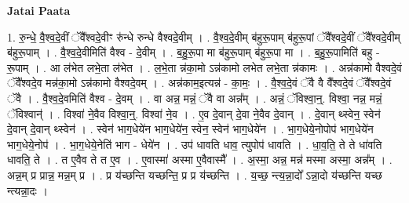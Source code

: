 \documentclass[17pt]{extarticle}
\begin{document}
\textbf{Jatai Paata} \newline

1. रु॒न्धे॒ वै॒श्व॒दे॒वीं ॅवै᳚श्वदे॒वीꣳ रु॑न्धे रुन्धे वैश्वदे॒वीम् । . वै॒श्व॒दे॒वीम् ब॑हुरू॒पाम् ब॑हुरू॒पां ॅवै᳚श्वदे॒वीं ॅवै᳚श्वदे॒वीम् ब॑हुरू॒पाम् । . वै॒श्व॒दे॒वीमिति॑ वैश्व - दे॒वीम् । . ब॒हु॒रू॒पा मा ब॑हुरू॒पाम् ब॑हुरू॒पा मा । . ब॒हु॒रू॒पामिति॑ बहु - रू॒पाम् । . आ ल॑भेत लभे॒ता ल॑भेत । . ल॒भे॒ता न्न॑का॒मो ऽन्न॑कामो लभेत लभे॒ता न्न॑कामः । . अन्न॑कामो वैश्वदे॒वं ॅवै᳚श्वदे॒व मन्न॑का॒मो ऽन्न॑कामो वैश्वदे॒वम् । . अन्न॑काम॒इत्यन्न॑ - का॒मः॒ । . वै॒श्व॒दे॒वं ॅवै वै वै᳚श्वदे॒वं ॅवै᳚श्वदे॒वं ॅवै । . वै॒श्व॒दे॒वमिति॑ वैश्व - दे॒वम् । . वा अन्न॒ मन्नं॒ ॅवै वा अन्न᳚म् । . अन्नं॒ ॅविश्वा॒न्॒. विश्वा॒ नन्न॒ मन्नं॒ ॅविश्वान्॑ । . विश्वा॑ ने॒वैव विश्वा॒न्॒. विश्वा॑ ने॒व । . ए॒व दे॒वान् दे॒वा ने॒वैव दे॒वान् । . दे॒वान् थ्स्वेन॒ स्वेन॑ दे॒वान् दे॒वान् थ्स्वेन॑ । . स्वेन॑ भाग॒धेये॑न भाग॒धेये॑न॒ स्वेन॒ स्वेन॑ भाग॒धेये॑न । . भा॒ग॒धेये॒नोपोप॑ भाग॒धेये॑न भाग॒धेये॒नोप॑ । . भा॒ग॒धेये॒नेति॑ भाग - धेये॑न । . उप॑ धावति धाव॒ त्युपोप॑ धावति । . धा॒व॒ति॒ ते ते धा॑वति धावति॒ ते । . त ए॒वैव ते त ए॒व । . ए॒वास्मा॑ अस्मा ए॒वैवास्मै᳚ । . अ॒स्मा॒ अन्न॒ मन्न॑ मस्मा अस्मा॒ अन्न᳚म् । . अन्न॒म् प्र प्रान्न॒ मन्न॒म् प्र । . प्र य॑च्छन्ति यच्छन्ति॒ प्र प्र य॑च्छन्ति । . य॒च्छ॒ न्त्य॒न्ना॒दो᳚ ऽन्ना॒दो य॑च्छन्ति यच्छ न्त्यन्ना॒दः । \newline
\end{document}
